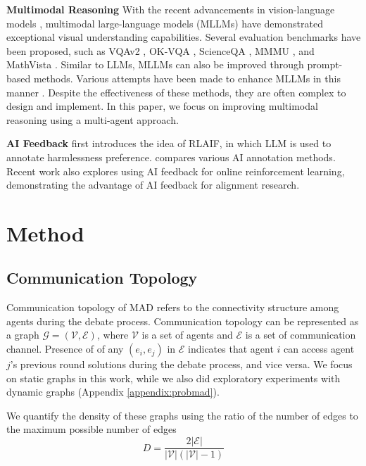 \documentclass[11pt]{article}
\begin{document}
\noindent \textbf{Multimodal Reasoning} With the recent advancements in vision-language models \cite{radford2021learning,yu2022coca, li2023blip,liu2024improved,lin2024moe}, multimodal large-language models (MLLMs) have demonstrated exceptional visual understanding capabilities. Several evaluation benchmarks have been proposed, such as VQAv2 \cite{balanced_vqa_v2}, OK-VQA \cite{okvqa}, ScienceQA \cite{lu2022learn}, MMMU \cite{yue2023mmmu}, and MathVista \cite{lu2023mathvista}. Similar to LLMs, MLLMs can also be improved through prompt-based methods. Various attempts have been made to enhance MLLMs in this manner \cite{zheng2024picture,ganz2024question,yang2023mm,zhao2024bba,zhang2023multimodal,chen2024large,Hu2024VisualSS}. Despite the effectiveness of these methods, they are often complex to design and implement. In this paper, we focus on improving multimodal reasoning using a multi-agent approach.

\noindent \textbf{AI Feedback} \citet{bai2022constitutional} first introduces the idea of RLAIF, in which LLM is used to annotate harmlessness preference. \citet{lee2023rlaif} compares various AI annotation methods. Recent work \citep{guo2024direct} also explores using AI feedback for online reinforcement learning, demonstrating the advantage of AI feedback for alignment research.


\section{Method}
\subsection{Communication Topology}
Communication topology of MAD refers to the connectivity structure among agents during the debate process. Communication topology can be represented as a graph $\mathcal{G}=(\mathcal{V}, \mathcal{E})$, where $\mathcal{V}$ is a set of agents and $\mathcal{E}$ is a set of communication channel. Presence of of any $(e_i, e_j)$ in $\mathcal{E}$ indicates that agent $i$ can access agent $j$'s previous round solutions during the debate process, and vice versa. We focus on static graphs in this work, while we also did exploratory experiments with dynamic graphs (Appendix \ref{appendix:probmad}).

We quantify the density of these graphs using the ratio of the number of edges to the maximum possible number of edges
$$D = \frac{2|\mathcal{E}|}{|\mathcal{V}| (|\mathcal{V}| - 1)}$$
\end{document}
